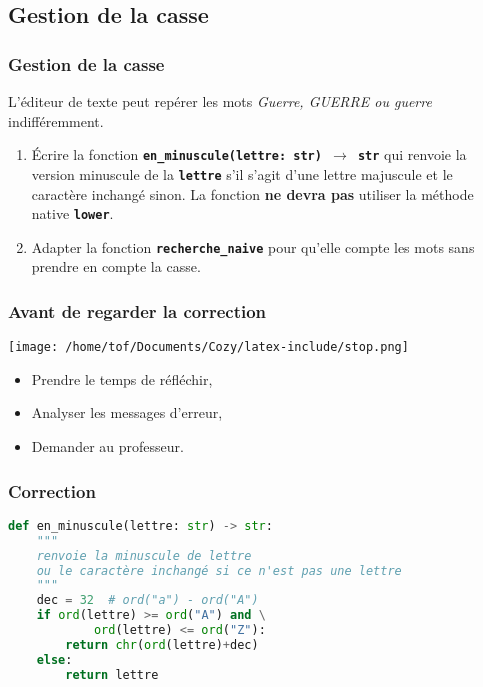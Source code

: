 \documentclass[svgnames,11pt]{beamer}
\begin{document}
\subsection{Gestion de la casse}
\begin{frame}
    \frametitle{Gestion de la casse}

    L'éditeur de texte peut repérer les mots \emph{Guerre, GUERRE ou guerre} indifféremment.
    \begin{activite}
    \begin{enumerate}
        \item Écrire la fonction \textbf{\texttt{en\_minuscule(lettre: str) $\rightarrow$ str}} qui renvoie la version minuscule de la \texttt{\textbf{lettre}} s'il s'agit d'une lettre majuscule et le caractère inchangé sinon. La fonction \textbf{ne devra pas} utiliser la méthode native \textbf{\texttt{lower}}.
        \item Adapter la fonction \textbf{\texttt{recherche\_naive}} pour qu'elle compte les mots sans prendre en compte la casse.
    \end{enumerate}
    \end{activite}

\end{frame}
\begin{frame}
    \frametitle{Avant de regarder la correction}
\begin{center}
    \centering
    \texttt{[image: /home/tof/Documents/Cozy/latex-include/stop.png]}
    \end{center}
{\Large
    \begin{itemize}
        \item Prendre le temps de réfléchir,
        \item Analyser les messages d'erreur,
        \item Demander au professeur.
    \end{itemize}
}
\end{frame}
\begin{frame}[fragile]
    \frametitle{Correction}

    \begin{center}
    \begin{lstlisting}[language=Python , basicstyle=\ttfamily\small, xleftmargin=1em, xrightmargin=1em]
def en_minuscule(lettre: str) -> str:
    """
    renvoie la minuscule de lettre
    ou le caractère inchangé si ce n'est pas une lettre
    """
    dec = 32  # ord("a") - ord("A")
    if ord(lettre) >= ord("A") and \
            ord(lettre) <= ord("Z"):
        return chr(ord(lettre)+dec)
    else:
        return lettre
\end{lstlisting}
    \end{center}

\end{frame}
\end{document}
